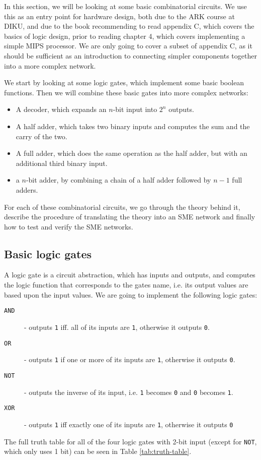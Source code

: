 In this section, we will be looking at some basic combinatorial circuits. We
use this as an entry point for hardware design, both due to the ARK
course\cite{ref:diku} at DIKU, and due to the book\cite{ref:ark} recommending
to read appendix C, which covers the basics of logic design, prior to reading
chapter 4, which covers implementing a simple MIPS processor. We are only going
to cover a subset of appendix C, as it should be sufficient as an introduction
to connecting simpler components together into a more complex network.


We start by looking at some logic gates, which implement some basic boolean
functions. Then we will combine these basic gates into more complex networks:
\begin{itemize}
    \item A decoder, which expands an $n$-bit input into $2^n$ outputs.
    \item A half adder, which takes two binary inputs and computes the sum and
        the carry of the two.
    \item A full adder, which does the same operation as the half adder, but
        with an additional third binary input.
    \item a $n$-bit adder, by combining a chain of a half adder followed by
        $n-1$ full adders.
\end{itemize}

For each of these combinatorial circuits, we go through the theory behind it,
describe the procedure of translating the theory into an SME network and
finally how to test and verify the SME networks.

\subsection{Basic logic gates}
A logic gate is a circuit abstraction, which has inputs and outputs, and
computes the logic function that corresponds to the gates name, i.e. its output
values are based upon the input values. We are going to implement the following
logic gates:

\begin{description}
    \item[\texttt{AND}] - outputs \texttt{1} iff. all of its inputs are
        \texttt{1}, otherwise it outputs \texttt{0}.

    \item[\texttt{OR}] - outputs \texttt{1} if one or more of its inputs are
        \texttt{1}, otherwise it outputs \texttt{0}.

    \item[\texttt{NOT}] - outputs the inverse of its input, i.e. \texttt{1}
        becomes \texttt{0} and \texttt{0} becomes \texttt{1}.

    \item[\texttt{XOR}] - outputs \texttt{1} iff exactly one of its inputs are
        \texttt{1}, otherwise it outputs \texttt{0}
\end{description}
The full truth table for all of the four logic gates with 2-bit input (except
for \texttt{NOT}, which only uses 1 bit) can be seen in Table
\ref{tab:truth-table}.

